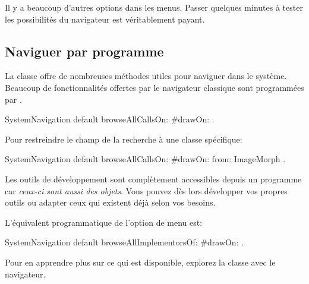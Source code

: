 \documentclass[a4paper,10pt,twoside]{book}
\begin{document}

Il y a beaucoup d'autres options dans les menus.  Passer quelques
minutes à tester les possibilités du navigateur est véritablement payant.  


\subsection{Naviguer par programme} %

La classe  offre de nombreuses méthodes utiles
pour naviguer dans le système.
Beaucoup de fonctionnalités offertes par le navigateur classique
sont programmées par
.


\begin{code}{}
SystemNavigation default browseAllCallsOn: #drawOn: .
\end{code}
Pour restreindre le champ de la recherche à une classe spécifique:
\begin{code}{}
SystemNavigation default browseAllCallsOn: #drawOn: from: ImageMorph .
\end{code}
Les outils de développement sont complètement accessibles depuis un
programme car \emph{ceux-ci sont aussi des objets}. Vous pouvez dès lors
développer vos propres outils ou adapter ceux qui existent déjà
selon vos besoins.

L'équivalent programmatique de l'option de menu
 est: %
\begin{code}{}
SystemNavigation default browseAllImplementorsOf: #drawOn: .
\end{code}

Pour en apprendre plus sur ce qui est disponible, explorez la classe
 avec le navigateur.

\end{document}
